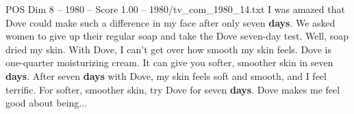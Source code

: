 \begin{textsample}{POS Dim 8 – 1980 – Score 1.00 – 1980/tv\_com\_1980\_14.txt}  \label{ex:f8_pos_050}
I was amazed that Dove could make such a difference in my face after only seven \textbf{days}.
We asked women to give up their regular soap and take the Dove seven-day test.
Well, soap dried my skin.
With Dove, I can't get over how smooth my skin feels.
Dove is one-quarter moisturizing cream.
It can give you softer, smoother skin in seven \textbf{days}.
After seven \textbf{days} with Dove, my skin feels soft and smooth, and I feel terrific.
For softer, smoother skin, try Dove for seven \textbf{days}.
Dove makes me feel good about being...

\end{textsample}
